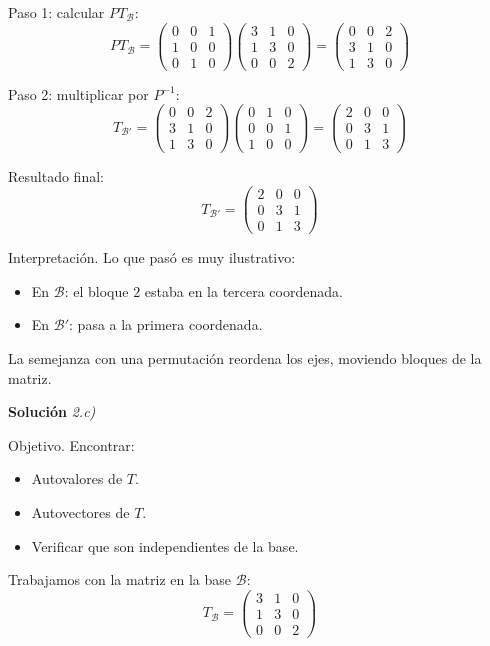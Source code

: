 \documentclass[11pt,spanish]{article}
\begin{document}
Paso 1: calcular $PT_{\mathcal{B}}$:
$$
P T_{\mathcal{B}} =
\begin{pmatrix}
0 & 0 & 1 \\
1 & 0 & 0 \\
0 & 1 & 0
\end{pmatrix}
\begin{pmatrix}
3 & 1 & 0 \\
1 & 3 & 0 \\
0 & 0 & 2
\end{pmatrix}
=
\begin{pmatrix}
0 & 0 & 2 \\
3 & 1 & 0 \\
1 & 3 & 0
\end{pmatrix}
$$

Paso 2: multiplicar por $P^{-1}$:
$$
T_{\mathcal{B}'} =
\begin{pmatrix}
0 & 0 & 2 \\
3 & 1 & 0 \\
1 & 3 & 0
\end{pmatrix}
\begin{pmatrix}
0 & 1 & 0 \\
0 & 0 & 1 \\
1 & 0 & 0
\end{pmatrix}
=
\begin{pmatrix}
2 & 0 & 0 \\
0 & 3 & 1 \\
0 & 1 & 3
\end{pmatrix}
$$

Resultado final:
$$
\boxed{
T_{\mathcal{B}'} =
\begin{pmatrix}
2 & 0 & 0 \\
0 & 3 & 1 \\
0 & 1 & 3
\end{pmatrix}
}
$$

Interpretación.
Lo que pasó es muy ilustrativo:
\begin{itemize}
\item En $\mathcal{B}$: el bloque $2$ estaba en la tercera coordenada.
\item En $\mathcal{B}'$: pasa a la primera coordenada.
\end{itemize}

La semejanza con una permutación reordena los ejes, moviendo bloques de la matriz.


\vspace{0.5cm}
{\bf Soluci\'on }{\em 2.c)}
\vspace{0.5cm}

Objetivo.
Encontrar:
\begin{itemize}
\item Autovalores de $T$.
\item Autovectores de $T$.
\item Verificar que son independientes de la base.
\end{itemize}
Trabajamos con la matriz en la base $\mathcal{B}$:
$$
T_{\mathcal{B}} =
\begin{pmatrix}
3 & 1 & 0 \\
1 & 3 & 0 \\
0 & 0 & 2
\end{pmatrix}
$$
\end{document}
